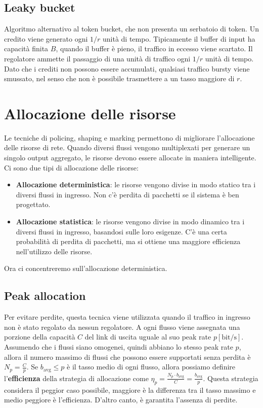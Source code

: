 \subsection{Leaky bucket}
Algoritmo alternativo al token bucket, che non presenta un serbatoio di token.
Un credito viene generato ogni $1/r$ unità di tempo.
Tipicamente il buffer di input ha capacità finita $B$, quando il buffer è pieno, il traffico in eccesso viene scartato.
Il regolatore ammette il passaggio di una unità di traffico ogni $1/r$ unità di tempo.
Dato che i crediti non possono essere accumulati, qualsiasi traffico bursty viene smussato, nel senso che non è possibile trasmettere a un tasso maggiore di $r$.
\section{Allocazione delle risorse}
Le tecniche di policing, shaping e marking permettono di migliorare l'allocazione delle risorse di rete.
Quando diversi flussi vengono multiplexati per generare un singolo output aggregato, le risorse devono essere allocate in maniera intelligente.
Ci sono due tipi di allocazione delle risorse:
\begin{itemize}
	\item \textbf{Allocazione deterministica}: le risorse vengono divise in modo statico tra i diversi flussi in ingresso. Non c'è perdita di pacchetti se il sistema è ben progettato.
	\item \textbf{Allocazione statistica}: le risorse vengono divise in modo dinamico tra i diversi flussi in ingresso, basandosi sulle loro esigenze. C'è una certa probabilità di perdita di pacchetti, ma si ottiene una maggiore efficienza nell'utilizzo delle risorse.
\end{itemize}
Ora ci concentreremo sull'allocazione deterministica.
\subsection{Peak allocation}
Per evitare perdite, questa tecnica viene utilizzata quando il traffico in ingresso non è stato regolato da nessun regolatore.
A ogni flusso viene assegnata una porzione della capacità $C$ del link di uscita uguale al suo peak rate $p [\text{bit}/\text{s}]$.
Assumendo che i flussi siano omogenei, quindi abbiano lo stesso peak rate $p$, allora il numero massimo di flussi che possono essere supportati senza perdita è $N_p =  \frac{C}{p} $.
Se $b_{\text{avg}}\leq p$ è il tasso medio di ogni flusso, allora possiamo definire l'\textbf{efficienza} della strategia di allocazione come $\eta_p = \frac{N_p \cdot b_{\text{avg}}}{C}=\frac{b_{\text{avg}}}{p}$.
Questa strategia considera il peggior caso possibile, maggiore è la differenza tra il tasso massimo e medio peggiore è l'efficienza.
D'altro canto, è garantita l'assenza di perdite.
